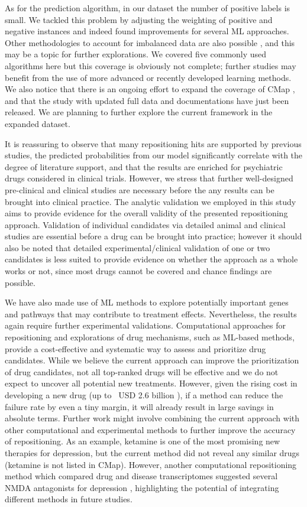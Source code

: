   As for the prediction algorithm, in our dataset the number of positive labels is small. We tackled this problem by adjusting the weighting of positive and negative instances and indeed found improvements for several ML approaches. Other methodologies to account for imbalanced data are also possible \cite{he2009learning}, and this may be a topic for further explorations. We covered five commonly used algorithms here but this coverage is obviously not complete; further studies may benefit from the use of more advanced or recently developed learning methods. We also notice that there is an ongoing effort to expand the coverage of CMap \cite{subramanian2017next}, and that the study with updated full data and documentations have just been released. We are planning to further explore the current framework in the expanded dataset. 

  It is reassuring to observe that many repositioning hits are supported by previous studies, the predicted probabilities from our model significantly correlate with the degree of literature support, and that the results are enriched for psychiatric drugs considered in clinical trials. However, we stress that further well-designed pre-clinical and clinical studies are necessary before the any results can be brought into clinical practice. The analytic validation we employed in this study aims to provide evidence for the overall validity of the presented repositioning approach. Validation of individual candidates via detailed animal and clinical studies are essential before a drug can be brought into practice; however it should also be noted that detailed experimental/clinical validation of one or two candidates is less suited to provide evidence on whether the approach as a whole works or not, since most drugs cannot be covered and chance findings are possible. 

  We have also made use of ML methods to explore potentially important genes and pathways that may contribute to treatment effects. Nevertheless, the results again require further experimental validations. Computational approaches for repositioning and explorations of drug mechanisms, such as ML-based methods, provide a cost-effective and systematic way to assess and prioritize drug candidates. While we believe the current approach can improve the prioritization of drug candidates, not all top-ranked drugs will be effective and we do not expect to uncover all potential new treatments. However, given the rising cost in developing a new drug (up to ~USD 2.6 billion \cite{katalinic2013ketamine}), if a method can reduce the failure rate by even a tiny margin, it will already result in large savings in absolute terms. Further work might involve combining the current approach with other computational and experimental methods to further improve the accuracy of repositioning. As an example, ketamine is one of the most promising new therapies for depression, but the current method did not reveal any similar drugs (ketamine is not listed in CMap). However, another computational repositioning method which compared drug and disease transcriptomes suggested several NMDA antagonists for depression \cite{katalinic2013ketamine}, highlighting the potential of integrating different methods in future studies.
  
